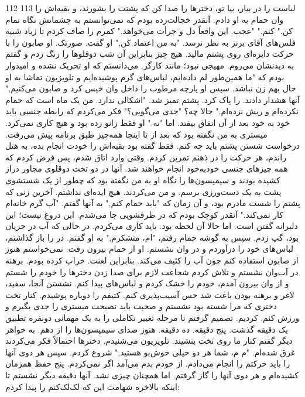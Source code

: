 112
113
لباست را در بیار، بیا تو، دخترها را صدا کن که پشتت را بشورند، و بقیه‌اش را
وان حمام به او دادم. آنقدر خجالت‌زده بودم که نمی‌توانستم به چشمانش نگاه
تمام کن." کنم."
"عجب. این واقعاً دل و جرأت می‌خواهد."
کمرم را صاف کردم تا زیاد شبیه فلس‌های آقای برنز به نظر نرسد.
"به من اعتماد کن," او گفت.
صورتک. او صابون را با حرکت دایره‌ای روی پشتم مالید. هیچ چیز
بنابراین آن شب دوقلوها را زنگ زدم و گفتم به دیدنشان می‌روم.
مهیجی نبود؛ مانند کارگر. می‌دانستم که او تحریک نشده و امیدوار بودم که
"ما همین‌طور لم داده‌ایم، لباس‌های گرم پوشیده‌ایم و تلویزیون تماشا
به او حال بهم زن نباشد. سپس او پارچه مرطوب را داخل وان خیس کرد و صابون
می‌کنیم," آنها هشدار دادند.
را پاک کرد. پشتم تمیز شد.
"اشکالی ندارد. من یک ماه است که حمام نکرده‌ام و ریش نزده‌ام."
حالا چه؟
"جدی می‌گویی؟"
فکر می‌کردم که رابطه جنسی باید خود به خود بعد از آن اتفاق بیفتد. اما
"نه."
او فقط زانو زده بود و هیچ کاری نمی‌کرد. میستری به من نگفته بود که بعد از
تا اینجا همه‌چیز طبق برنامه پیش می‌رفت.
درخواست شستن پشتم باید چه کنم. فقط گفته بود بقیه‌اش را خودت انجام بده،
به هتل راندم، هر حرکت را در ذهنم تمرین کردم. وقتی وارد اتاق شدم،
پس فرض کردم که همه چیزهای جنسی خودبه‌خود انجام خواهند شد.
آنها در دو تخت دوقلوی مجاور دراز کشیده بودند و سیمپسون‌ها را نگاه
او به من نگفته بود که چطور از یک شستشوی پشت به یک دست‌ورزی برسم. و من
می‌کردند.
هیچ ایده‌ای نداشتم. آخرین زنی که پشتم را شست مادرم بود، و آن زمان که
"باید حمام کنم," به آنها گفتم. "آب گرم خانه‌ام کار نمی‌کند."
آنقدر کوچک بودم که در ظرفشویی جا می‌شدم.
این دروغ نیست؛ این دلبرانه گفتن است.
اما حالا آن لحظه بود. باید کاری می‌کردم.
در حالی که آب در جریان بود، گپ زدم. سپس به گوشه حمام رفتم،
"ام، متشکرم," به او گفتم.
در را باز گذاشتم، لباس‌های خود را درآوردم و در وان نشستم.
او از حمام بیرون رفت.
نمی‌خواستم هنوز از صابون استفاده کنم چون آب را کثیف می‌کند. بنابراین
لعنت. خراب کرده بودم.
برهنه در آب‌وان نشستم و تلاش کردم شجاعت لازم برای صدا زدن دخترها را
خودم را شستم و از وان بیرون آمدم، خودم را خشک کردم و لباس‌های
پیدا کنم. نشستن آنجا، سفید، لاغر و برهنه بودن باعث شد حس آسیب‌پذیری کنم.
کثیفم را دوباره پوشیدم. کنار تخت دختری که مرا شسته بود نشستم و صحبت
باید نصیحت میستری را جدی بگیرم و ورزش کنم.
کردیم. تصمیم گرفتم تا مرحله تغییر تکاملی را به یک مهمانی دونفره تطبیق
یک دقیقه گذشت. پنج دقیقه. ده دقیقه. هنوز صدای سیمپسون‌ها را از
دهم. به خواهر دیگر گفتم کنار ما روی تخت بنشیند.
تلویزیون می‌شنیدم. دخترها احتمالاً فکر می‌کردند غرق شده‌ام.
"م م، شما هر دو خیلی خوش‌بو هستید," شروع کردم. سپس هر دوی آنها را
باید حرکتم را انجام می‌دادم. از خودم بدم می‌آمد اگر نمی‌کردم. پنج حفظ
همزمان کشیده‌ام و هر دوی آنها را گاز گرفتم. اما همچنان چیزی نشد. آنها
دقیقه دیگر نشستم تا اینکه بالاخره شهامت این که لک‌لک‌کنم را پیدا کردم:
